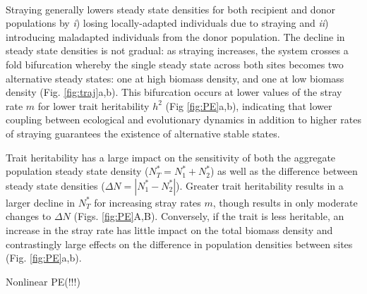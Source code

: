 \documentclass[twocolumn,preprintnumbers,amsmath,amssymb,superscriptaddress]{revtex4}
\begin{document}

 \\
\noindent Straying generally lowers steady state densities for both recipient and donor populations by \emph{i}) losing locally-adapted individuals due to straying and \emph{ii}) introducing maladapted individuals from the donor population. %
The decline in steady state densities is not gradual: as straying increases, the system crosses a fold bifurcation whereby the single steady state across both sites becomes two alternative steady states: one at high biomass density, and one at low biomass density (Fig. \ref{fig:traj}a,b).
This bifurcation occurs at lower values of the stray rate $m$ for lower trait heritability $h^2$ (Fig \ref{fig:PE}a,b), indicating that lower coupling between ecological and evolutionary dynamics in addition to higher rates of straying guarantees the existence of alternative stable states.

Trait heritability has a large impact on the sensitivity of both the aggregate population steady state density ($N^*_T=N^*_1+N^*_2$) as well as the difference between steady state densities ($\Delta N=|N^*_1-N^*_2|$).
Greater trait heritability results in a larger decline in $N_T^*$ for increasing stray rates $m$, though results in only moderate changes to $\Delta N$ (Figs. \ref{fig:PE}A,B).
Conversely, if the trait is less heritable, an increase in the stray rate has little impact on the total biomass density and contrastingly large effects on the difference in population densities between sites (Fig. \ref{fig:PE}a,b).





Nonlinear PE(!!!)
\end{document}
